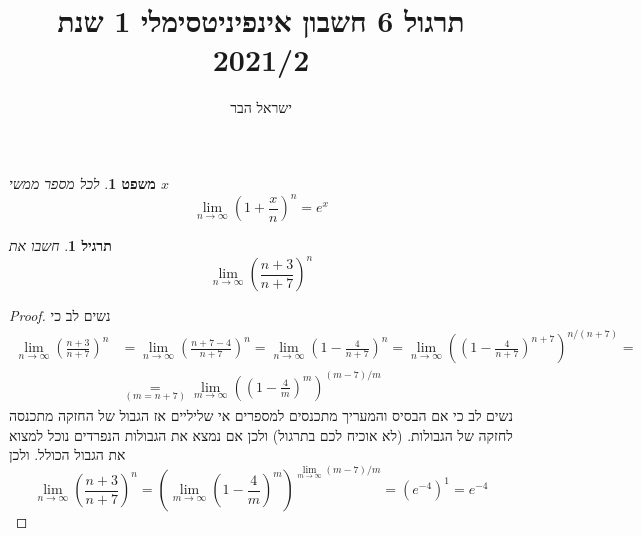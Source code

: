 \documentclass{article}
\begin{document}
\title{תרגול 6 חשבון אינפיניטסימלי 1 שנת 2021/2}
\author{ישראל הבר}
\maketitle

\newtheorem{theorem}{משפט}
\newtheorem{exercise}{תרגיל}
\newtheorem{homeexercise}{תרגיל לבית}
\newtheorem{example}{דוגמה}
\theoremstyle{definition}
\newtheorem{definition}{הגדרה}
\newtheorem{notation}{סימון}
\newtheorem{claim}{טענה}
\newtheorem{comment}{\emph{הערה}}
\renewcommand\qedsymbol{$\blacksquare$}
\newcommand{\limtoinfty}{\underset{n\rightarrow\infty}{\lim}}
\newcommand{\limtur}{\overset{\infty}{\underset{n=1}{\sum}}}
\newcommand{\limturstart}[1]{\overset{\infty}{\underset{n=#1}{\sum}}}
\newcommand{\limsuptoinfty}{\underset{n\rightarrow\infty}{\limsup}}
\newcommand{\liminftoinfty}{\underset{n\rightarrow\infty}{\liminf}}
\newcommand{\limtoinftym}{\underset{m\rightarrow\infty}{\lim}}
\newcommand{\limtop}{\underset{-}{\lim}}
\newcommand{\limbottom}{\overset{-}{\lim}}
\newcommand{\goesto}{\underset{n\rightarrow\infty}{\longrightarrow}}
\newcommand{\goestom}{\underset{m\rightarrow\infty}{\longrightarrow}}
\newcommand{\goesfrom}{\underset{n\rightarrow\infty}{\longleftarrow}}
\newcommand{\series}[2]{\{#1\}_{#2\in\mathbb{N}}}

\begin{theorem}
לכל מספר ממשי 
$x$
\[\limtoinfty \left(1+\frac{x}{n}\right)^n =e^x\]
\end{theorem}

\begin{exercise}
חשבו את 
\[\limtoinfty \left(\frac{n+3}{n+7}\right)^n\]
\end{exercise}

\begin{proof}
נשים לב כי
\begin{align*}
\limtoinfty \left(\frac{n+3}{n+7}\right)^n &= \limtoinfty \left(\frac{n+7-4}{n+7}\right)^n = \limtoinfty\left(1-\frac{4}{n+7}\right)^n = \limtoinfty\left(\left(1-\frac{4}{n+7}\right)^{n+7}\right)^{n/(n+7)} = \\ &\underset{(m=n+7)}{=} \limtoinftym\left(\left(1-\frac{4}{m}\right)^{m}\right)^{(m-7)/m}
\end{align*}
נשים לב כי אם הבסיס והמעריך מתכנסים למספרים אי שליליים אז הגבול של החזקה מתכנסה לחזקה של הגבולות. (לא אוכיח לכם בתרגול) ולכן אם נמצא את הגבולות הנפרדים נוכל למצוא את הגבול הכולל. ולכן 
\[\limtoinfty \left(\frac{n+3}{n+7}\right)^n = \left(\limtoinftym\left(1-\frac{4}{m}\right)^{m}\right)^{\limtoinftym (m-7)/m} = \left(e^{-4}\right)^{1} = e^{-4}\]
\end{proof}
\end{document}
